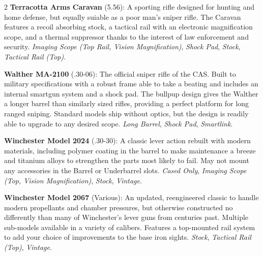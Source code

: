 \documentclass[
  oneside]{article}
\begin{document}
\begin{multicols}{2}
\textbf{Terracotta Arms Caravan} (5.56): A
sporting rifle designed for hunting and home
defense, but equally suiable as a poor man's
sniper rifle. The Caravan features a recoil
absorbing stock, a tactical rail with an
electronic magnification scope, and a thermal
suppressor thanks to the interest of law
enforcement and security. \emph{Imaging Scope (Top
Rail, Vision Magnification)}, \emph{Shock Pad},
\emph{Stock}, \emph{Tactical Rail (Top)}.

\textbf{Walther MA-2100} (.30-06): The official
sniper rifle of the CAS. Built to military
specifications with a robust frame able to take a
beating and includes an internal smartgun system
and a shock pad. The bullpup design gives the
Walther a longer barrel than similarly sized
rifles, providing a perfect platform for long
ranged sniping. Standard models ship without
optics, but the design is readily able to upgrade
to any desired scope. \emph{Long Barrel},
\emph{Shock Pad}, \emph{Smartlink}.

\textbf{Winchester Model 2024} (.30-30): A classic
lever action rebuilt with modern materials,
including polymer coating in the barrel to make
maintenance a breeze and titanium alloys to
strengthen the parts most likely to fail. May not
mount any accessories in the Barrel or Underbarrel
slots. \emph{Cased Only}, \emph{Imaging Scope
(Top, Vision Magnification)}, \emph{Stock},
\emph{Vintage}.

\textbf{Winchester Model 2067} (Various): An
updated, reengineered classic to handle modern
propellants and chamber pressures, but otherwise
constructed no differently than many of
Winchester's lever guns from centuries past.
Multiple sub-models available in a variety of
calibers. Features a top-mounted rail system to
add your choice of improvements to the base iron
sights. \emph{Stock}, \emph{Tactical Rail (Top)},
\emph{Vintage}.

\end{multicols}
\end{document}
